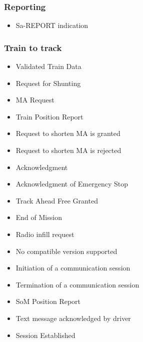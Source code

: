 \documentclass{template/openetcs_article}
\begin{document}
		\subsubsection{Reporting}
			\begin{itemize}
				\item Sa-REPORT indication				
			\end{itemize}
					
		\subsubsection{Train to track}
			\begin{itemize}
				\item Validated Train Data
				\item Request for Shunting
				\item MA Request
				\item Train Position Report
				\item Request to shorten MA is granted
				\item Request to shorten MA is rejected
				\item Acknowledgment
				\item Acknowledgment of Emergency Stop
				\item Track Ahead Free Granted
				\item End of Mission
				\item Radio infill request
				\item No compatible version supported
				\item Initiation of a communication session
				\item Termination of a communication session
				\item SoM Position Report
				\item Text message acknowledged by driver
				\item Session Established
			\end{itemize}
			
\end{document}
